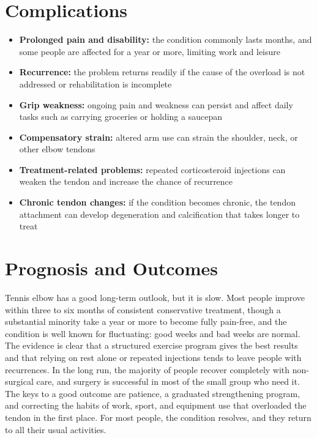 \section*{Complications}
\begin{itemize}
    \item \textbf{Prolonged pain and disability:} the condition commonly lasts months, and some people are affected for a year or more, limiting work and leisure
    \item \textbf{Recurrence:} the problem returns readily if the cause of the overload is not addressed or rehabilitation is incomplete
    \item \textbf{Grip weakness:} ongoing pain and weakness can persist and affect daily tasks such as carrying groceries or holding a saucepan
    \item \textbf{Compensatory strain:} altered arm use can strain the shoulder, neck, or other elbow tendons
    \item \textbf{Treatment-related problems:} repeated corticosteroid injections can weaken the tendon and increase the chance of recurrence
    \item \textbf{Chronic tendon changes:} if the condition becomes chronic, the tendon attachment can develop degeneration and calcification that takes longer to treat
\end{itemize}

\section*{Prognosis and Outcomes}
Tennis elbow has a good long-term outlook, but it is slow. Most people improve within three to six months of consistent conservative treatment, though a substantial minority take a year or more to become fully pain-free, and the condition is well known for fluctuating: good weeks and bad weeks are normal. The evidence is clear that a structured exercise program gives the best results and that relying on rest alone or repeated injections tends to leave people with recurrences. In the long run, the majority of people recover completely with non-surgical care, and surgery is successful in most of the small group who need it. The keys to a good outcome are patience, a graduated strengthening program, and correcting the habits of work, sport, and equipment use that overloaded the tendon in the first place. For most people, the condition resolves, and they return to all their usual activities.

